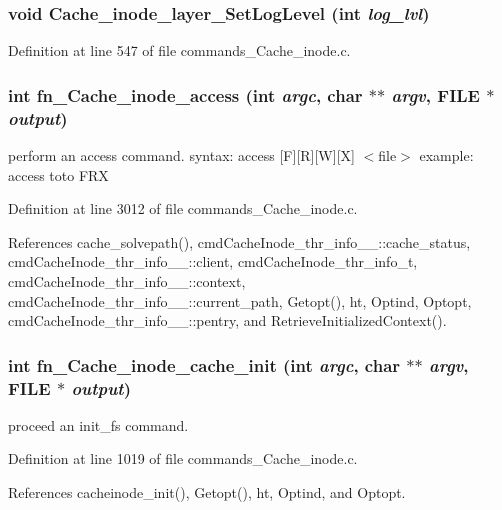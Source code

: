 \subsubsection{\setlength{\rightskip}{0pt plus 5cm}void Cache\_\-inode\_\-layer\_\-Set\-Log\-Level (int {\em log\_\-lvl})}\label{commands_8h_a35}




Definition at line 547 of file commands\_\-Cache\_\-inode.c.
\subsubsection{\setlength{\rightskip}{0pt plus 5cm}int fn\_\-Cache\_\-inode\_\-access (int {\em argc}, char $\ast$$\ast$ {\em argv}, FILE $\ast$ {\em output})}\label{commands_8h_a58}


perform an access command. syntax: access [F][R][W][X] $<$file$>$ example: access toto FRX 

Definition at line 3012 of file commands\_\-Cache\_\-inode.c.

References cache\_\-solvepath(), cmd\-Cache\-Inode\_\-thr\_\-info\_\-\_\-::cache\_\-status, cmd\-Cache\-Inode\_\-thr\_\-info\_\-\_\-::client, cmd\-Cache\-Inode\_\-thr\_\-info\_\-t, cmd\-Cache\-Inode\_\-thr\_\-info\_\-\_\-::context, cmd\-Cache\-Inode\_\-thr\_\-info\_\-\_\-::current\_\-path, Getopt(), ht, Optind, Optopt, cmd\-Cache\-Inode\_\-thr\_\-info\_\-\_\-::pentry, and Retrieve\-Initialized\-Context().
\subsubsection{\setlength{\rightskip}{0pt plus 5cm}int fn\_\-Cache\_\-inode\_\-cache\_\-init (int {\em argc}, char $\ast$$\ast$ {\em argv}, FILE $\ast$ {\em output})}\label{commands_8h_a36}


proceed an init\_\-fs command. 

Definition at line 1019 of file commands\_\-Cache\_\-inode.c.

References cacheinode\_\-init(), Getopt(), ht, Optind, and Optopt.
